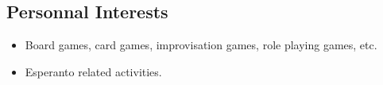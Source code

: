 \documentclass[12pt,a4paper]{article}
\newenvironment{itemcvsection}[1]%
               {\subsection*{#1}\begin{itemize}}
               {\end{itemize}}
\begin{document}
\begin{itemcvsection}{Personnal Interests}

	\item Board games, card games, improvisation games, role playing games, etc.
    \item Esperanto related activities.

\end{itemcvsection}
\end{document}
